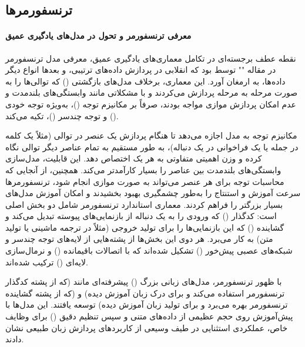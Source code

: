 \subsection{ترنسفورمرها}

\paragraph{معرفی ترنسفورمر و تحول در مدل‌های یادگیری عمیق}
نقطه عطف برجسته‌ای در تکامل معماری‌های یادگیری عمیق، معرفی مدل ترنسفورمر در مقاله "" توسط \textcite{attention} بود که انقلابی در پردازش داده‌های ترتیبی، و بعدها انواع دیگر داده‌ها، به ارمغان آورد. این معماری، برخلاف مدل‌های بازگشتی () که توالی‌ها را به صورت مرحله به مرحله پردازش می‌کردند و با مشکلاتی مانند وابستگی‌های بلندمدت و عدم امکان پردازش موازی مواجه بودند، صرفاً بر مکانیزم توجه ()، به‌ویژه توجه خودی () و توجه چندسر ()، تکیه می‌کند.

مکانیزم توجه به مدل اجازه می‌دهد تا هنگام پردازش یک عنصر در توالی (مثلاً یک کلمه در جمله یا یک فراخوانی  در یک دنباله)، به طور مستقیم به تمام عناصر دیگر توالی نگاه کرده و وزن اهمیتی متفاوتی به هر یک اختصاص دهد. این قابلیت، مدل‌سازی وابستگی‌های بلندمدت بین عناصر را بسیار کارآمدتر می‌کند. همچنین، از آنجایی که محاسبات توجه برای هر عنصر می‌تواند به صورت موازی انجام شود، ترنسفورمرها سرعت آموزش و استنتاج را به‌طور چشمگیری بهبود بخشیدند و امکان آموزش مدل‌های بسیار بزرگتر را فراهم کردند. معماری استاندارد ترنسفورمر شامل دو بخش اصلی است: کدگذار () که ورودی را به یک دنباله از بازنمایی‌های پیوسته تبدیل می‌کند و گشاینده () که این بازنمایی‌ها را برای تولید خروجی (مثلاً در ترجمه ماشینی یا تولید متن) به کار می‌برد. هر دوی این بخش‌ها از پشته‌هایی از لایه‌های توجه چندسر و شبکه‌های عصبی پیش‌خور () تشکیل شده‌اند که با اتصالات باقیمانده () و نرمال‌سازی لایه‌ای () ترکیب شده‌اند.

با ظهور ترنسفورمر، مدل‌های زبانی بزرگ () پیشرفته‌ای مانند  \cite{Devlin2019} (که از پشته کدگذار ترنسفورمر استفاده می‌کند و برای درک زبان آموزش دیده) و  \cite{Radford2018, Radford2019, Brown2020} (که از پشته گشاینده ترنسفورمر بهره می‌برد و برای تولید زبان آموزش دیده) توسعه یافتند. این مدل‌ها با پیش‌آموزش روی حجم عظیمی از داده‌های متنی و سپس تنظیم دقیق () برای وظایف خاص، عملکردی استثنایی در طیف وسیعی از کاربردهای پردازش زبان طبیعی نشان دادند.

